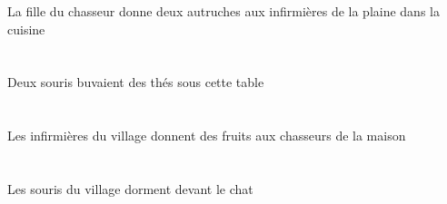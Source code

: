 \begin{exe}
La fille du chasseur donne deux autruches aux infirmières de la plaine dans la cuisine
\ex\glll
\DEMSgObl{}   \tableDSgObl{}   \SOUS{}   \INDDuErg{}   \sourisBDuErg{}   \INDPlAbs{}   \theBPlAbs{}  \boireVtPstBPl{}\\
\DEMSgOblP{}   \tableDSgOblP{}   \SOUSP{}   \INDDuErgP{}   \sourisBDuErgP{}   \INDPlAbsP{}   \theBPlAbsP{}  \boireVtPstBPlP{}\\
\DEMSgOblG{}   \tableDSgOblG{}   \SOUSG{}   \INDDuErgG{}   \sourisBDuErgG{}   \INDPlAbsG{}   \theBPlAbsG{}  \boireVtPstBPlG{}\\
Deux souris buvaient des thés sous cette table
\ex\glll
\DEFSgObl{}   \maisonDSgObl{}   \DE{}   \DEFPlErg{}    \DEFSgObl{}   \villageCSgObl{}   \DE{}   \infirmiereAPlErg{}    \DEFPlDat{}   \chasseurCPlDat{}   \INDPlAbs{}   \fruitAPlAbs{}  \donnerVdPrsAPl{}\\
\DEFSgOblP{}   \maisonDSgOblP{}   \DEP{}   \DEFPlErgP{}    \DEFSgOblP{}   \villageCSgOblP{}   \DEP{}   \infirmiereAPlErgP{}    \DEFPlDatP{}   \chasseurCPlDatP{}   \INDPlAbsP{}   \fruitAPlAbsP{}  \donnerVdPrsAPlP{}\\
\DEFSgOblG{}   \maisonDSgOblG{}   \DEG{}   \DEFPlErgG{}    \DEFSgOblG{}   \villageCSgOblG{}   \DEG{}   \infirmiereAPlErgG{}    \DEFPlDatG{}   \chasseurCPlDatG{}   \INDPlAbsG{}   \fruitAPlAbsG{}  \donnerVdPrsAPlG{}\\
Les infirmières du village donnent des fruits aux chasseurs de la maison
\ex\glll
\DEFPlAbs{}    \DEFSgObl{}   \villageCSgObl{}   \DE{}   \sourisBPlAbs{}    \DEFSgObl{}   \chatDSgObl{}   \DEVANT{}  \dormirViPrsBPl{}\\
\DEFPlAbsP{}    \DEFSgOblP{}   \villageCSgOblP{}   \DEP{}   \sourisBPlAbsP{}    \DEFSgOblP{}   \chatDSgOblP{}   \DEVANTP{}  \dormirViPrsBPlP{}\\
\DEFPlAbsG{}    \DEFSgOblG{}   \villageCSgOblG{}   \DEG{}   \sourisBPlAbsG{}    \DEFSgOblG{}   \chatDSgOblG{}   \DEVANTG{}  \dormirViPrsBPlG{}\\
Les souris du village dorment devant le chat
\ex\glll
\DEFPlAbs{}    \DEFPlObl{}   \grandCPl{}   \maigreCPl{}   \filleCPlObl{}   \DE{}   \petitDPl{}   \litDPlAbs{}    \DEFSgObl{}   \chambreBSgObl{}   \DANS{}  \arriverViPrsDPl{}\\
\DEFPlAbsP{}    \DEFPlOblP{}   \grandCPlP{}   \maigreCPlP{}   \filleCPlOblP{}   \DEP{}   \petitDPlP{}   \litDPlAbsP{}    \DEFSgOblP{}   \chambreBSgOblP{}   \DANSP{}  \arriverViPrsDPlP{}\\
\DEFPlAbsG{}    \DEFPlOblG{}   \grandCPlG{}   \maigreCPlG{}   \filleCPlOblG{}   \DEG{}   \petitDPlG{}   \litDPlAbsG{}    \DEFSgOblG{}   \chambreBSgOblG{}   \DANSG{}  \arriverViPrsDPlG{}\\

\end{exe}
